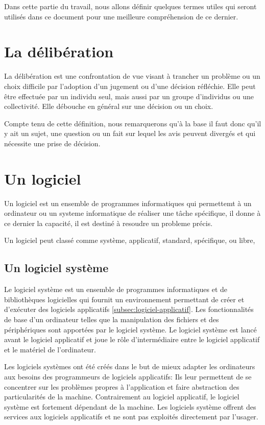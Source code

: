 Dans cette partie du travail, nous allons définir quelques termes utiles qui seront utilisés dans ce document
pour une meilleure compréhension de ce dernier.

\section{La délibération}\label{sec:deliberation}
La délibération \cite{deliberation} est une confrontation de vue
visant à trancher un problème ou un choix difficile par l'adoption d'un
jugement ou d'une décision réfléchie. Elle peut être effectuée par un individu seul,
mais aussi par un groupe d'individus ou une collectivité. Elle débouche en général sur
une décision ou un choix.

Compte tenu de cette définition, nous remarquerons qu'à la base il faut donc qu'il y ait
un sujet, une question ou un fait sur lequel les avis peuvent divergés et qui nécessite
une prise de décision.
\section{Un logiciel}\label{sec:application}
Un logiciel\cite{logiciel} est un ensemble de programmes informatiques qui
permettemt à un ordinateur ou un systeme informatique de réaliser une t\^ache spécifique,
il donne à ce dernier la capacité, il est destiné à resoudre un probleme précis.

Un logiciel peut classé comme système, applicatif, standard, spécifique, ou libre,

\subsection{Un logiciel système}\label{subsec:logiciel-systeme}
Le logiciel système est un ensemble de programmes informatiques et de bibliothèques logicielles
qui fournit un environnement permettant de créer et d'exécuter des logiciels applicatifs \ref{subsec:logiciel-applicatif}.
Les fonctionnalités de base d'un ordinateur telles que la manipulation des fichiers et
des périphériques sont apportées par le logiciel système. Le logiciel système est lancé avant le
logiciel applicatif et joue le rôle d'intermédiaire entre le logiciel applicatif et le matériel de
l'ordinateur.

Les logiciels systèmes\cite{logiciel_systeme} ont été créés dans le but de mieux adapter les ordinateurs aux besoins des
programmeurs de logiciels applicatifs: Ils leur permettent de se concentrer sur les problèmes propres
à l'application et faire abstraction des particularités de la machine. Contrairement au logiciel
applicatif, le logiciel système est fortement dépendant de la machine. Les logiciels système offrent
des services aux logiciels applicatifs et ne sont pas exploités directement par l'usager.

